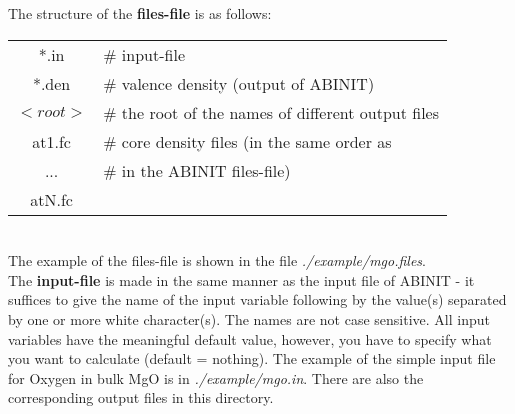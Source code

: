 \documentclass[11pt]{article}
\begin{document}
The structure of the {\bf files-file} is as follows: \\[1.5\baselineskip]
\begin{tabular}{cl}
 *.in   & \# input-file \\  
 *.den  & \# valence density (output of ABINIT) \\
 $<root>$ & \# the root of the names of different output files \\
 at1.fc & \# core density files (in the same order as \\
 ...    & \# in the ABINIT files-file) \\
 atN.fc & \\
\end{tabular} \\[1.5\baselineskip]
The example of the files-file is shown in the file {\it ./example/mgo.files}.\\

The {\bf input-file} is made in the same manner as the input file of
ABINIT - it suffices to give the name of the input variable following
by the value(s) separated by one or more white character(s).
The names are not case sensitive. All input variables have the meaningful
default value, however, you have to specify what you want to calculate
(default = nothing). The example of the simple input file for Oxygen in 
bulk MgO is in {\it ./example/mgo.in}. There are also the
corresponding output files in this directory.\\
\end{document}
